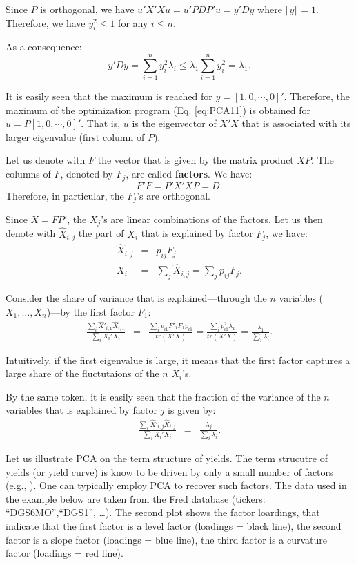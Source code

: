 \documentclass[
  12pt,
]{book}
\theoremstyle{definition}
\theoremstyle{definition}
\theoremstyle{definition}
\theoremstyle{definition}
\theoremstyle{remark}
\begin{document}
Since \(P\) is orthogonal, we have \(u'X'Xu=u'PDP'u=y'Dy\) where \(\left\Vert y\right\Vert =1\). Therefore, we have \(y_{i}^{2}\leq 1\) for any \(i\leq n\).

As a consequence:
\[
y'Dy=\sum_{i=1}^{n}y_{i}^{2}\lambda_{i}\leq\lambda_{1}\sum_{i=1}^{n}y_{i}^{2}=\lambda_{1}.
\]

It is easily seen that the maximum is reached for \(y=\left[1,0,\cdots,0\right]'\). Therefore, the maximum of the optimization program (Eq. \eqref{eq:PCA11}) is obtained for \(u=P\left[1,0,\cdots,0\right]'\). That is, \(u\) is the eigenvector of \(X'X\) that is associated with its larger eigenvalue (first column of \(P\)).

Let us denote with \(F\) the vector that is given by the matrix product \(XP\). The columns of \(F\), denoted by \(F_{j}\), are called \textbf{factors}. We have:
\[
F'F=P'X'XP=D.
\]
Therefore, in particular, the \(F_{j}\)'s are orthogonal.

Since \(X=FP'\), the \(X_{j}\)'s are linear combinations of the factors. Let us then denote with \(\hat{X}_{i,j}\) the part of \(X_{i}\) that is explained by factor \(F_{j}\), we have:
\begin{eqnarray*}
\hat{X}_{i,j} & = & p_{ij}F_{j}\\
X_{i} & = & \sum_{j}\hat{X}_{i,j}=\sum_{j}p_{ij}F_{j}.
\end{eqnarray*}

Consider the share of variance that is explained---through the \(n\) variables (\(X_{1},\ldots,X_{n}\))---by the first factor \(F_{1}\):
\begin{eqnarray*}
\frac{\sum_{i}\hat{X}'_{i,1}\hat{X}_{i,1}}{\sum_{i}X_{i}'X_{i}} & = & \frac{\sum_{i}p_{i1}F'_{1}F_{1}p_{i1}}{tr(X'X)} = \frac{\sum_{i}p_{i1}^{2}\lambda_{1}}{tr(X'X)} = \frac{\lambda_{1}}{\sum_{i}\lambda_{i}}.
\end{eqnarray*}

Intuitively, if the first eigenvalue is large, it means that the first factor captures a large share of the fluctutaions of the \(n\) \(X_{i}\)'s.

By the same token, it is easily seen that the fraction of the variance of the \(n\) variables that is explained by factor \(j\) is given by:
\begin{eqnarray*}
\frac{\sum_{i}\hat{X}'_{i,j}\hat{X}_{i,j}}{\sum_{i}X_{i}'X_{i}} & = & \frac{\lambda_{j}}{\sum_{i}\lambda_{i}}.
\end{eqnarray*}

Let us illustrate PCA on the term structure of yields. The term strucutre of yields (or yield curve) is know to be driven by only a small number of factors (e.g., \citet{Litterman_Scheinkman_1991}). One can typically employ PCA to recover such factors. The data used in the example below are taken from the \href{https://fred.stlouisfed.org}{Fred database} (tickers: ``DGS6MO'',``DGS1'', \ldots). The second plot shows the factor loardings, that indicate that the first factor is a level factor (loadings = black line), the second factor is a slope factor (loadings = blue line), the third factor is a curvature factor (loadings = red line).
\end{document}
